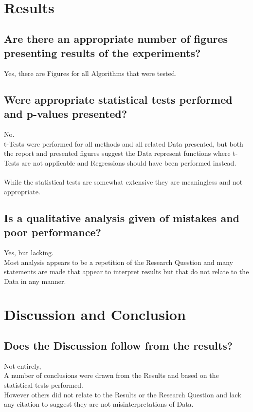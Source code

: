 \documentclass{article}
\begin{document}
    \section{Results}
      \subsection{ Are there an appropriate number of figures presenting results of the experiments?}
        Yes, there are Figures for all Algorithms that were tested.
      \subsection{ Were appropriate statistical tests performed and p-values presented?}
        No.
        \\
        t-Tests were performed for all methods and all related Data presented, but both the report and presented figures suggest the Data represent functions where t-Tests are not applicable and Regressions should have been performed instead.
        \\\\
        While the statistical tests are somewhat extensive they are meaningless and not appropriate.
      \subsection{ Is a qualitative analysis given of mistakes and poor performance?}
        Yes, but lacking.
        \\
        Most analysis appears to be a repetition of the Research Question and many statements are made that appear to interpret results but that do not relate to the Data in any manner.
        
    \section{Discussion and Conclusion}  
      \subsection{ Does the Discussion follow from the results?}
        Not entirely,
        \\
        A number of conclusions were drawn from the Results and based on the statistical tests performed.
        \\
        However others did not relate to the Results or the Research Question and lack any citation to suggest they are not misinterpretations of Data.
\end{document}

